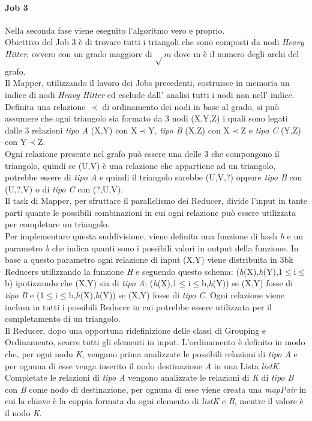 \documentclass[paper=a4, fontsize=11pt]{scrartcl}	%
\numberwithin{equation}{section}															%
\numberwithin{figure}{section}																%
\numberwithin{table}{section}																%
\begin{document}
\paragraph{Job 3}
Nella seconda fase viene eseguito l'algoritmo vero e proprio.\\
Obiettivo del Job 3 è di trovare tutti i triangoli che sono composti da nodi \textit{Heavy Hitter}, ovvero con un grado maggiore di $\sqrt{} m$ dove m è il numero degli archi del grafo.\\
Il Mapper, utilizzando il lavoro dei Jobs precedenti, costruisce in memoria un indice di nodi \textit{Heavy Hitter} ed esclude dall' analisi tutti i nodi non nell' indice.\\
Definita una relazione $\prec$ di ordinamento dei nodi in base al grado, si può assumere che ogni triangolo sia formato da 3 nodi (X,Y,Z) i quali sono legati dalle 3 relazioni \textit{tipo A} (X,Y) con X$\prec$Y, \textit{tipo B} (X,Z) con X$\prec$Z e \textit{tipo C} (Y,Z) con Y$\prec$Z.\\
Ogni relazione presente nel grafo può essere una delle 3 che compongono il triangolo, quindi se (U,V) è una relazione che appartiene ad un triangolo, potrebbe essere di \textit{tipo A} e quindi  il triangolo sarebbe (U,V,?) oppure \textit{tipo B} con (U,?,V) o di \textit{tipo C} con (?,U,V).\\
Il task di Mapper, per sfruttare il parallelismo dei Reducer, divide l'input in tante parti quante le possibili combinazioni in cui ogni relazione può essere utilizzata per completare un triangolo.\\
Per implementare questa suddivisione, viene definita una funzione di hash \textit{h} e un parametro \textit{b} che indica quanti sono i possibili valori in output della funzione. In base a questo parametro ogni relazione di input (X,Y) viene distribuita in 3bk Reducers utilizzando la funzione \textit{H} e seguendo questo schema: (\textit{h}(X),\textit{h}(Y),1$\leq$i$\leq$b) ipotizzando che (X,Y) sia di \textit{tipo A}; (\textit{h}(X),1$\leq$i$\leq$b,\textit{h}(Y)) se (X,Y) fosse di \textit{tipo B} e (1$\leq$i$\leq$b,\textit{h}(X),\textit{h}(Y)) se (X,Y) fosse di \textit{tipo C}. Ogni relazione viene inclusa in tutti i possibili Reducer in cui potrebbe essere utilizzata per il completamento di un triangolo.\\
Il Reducer, dopo una opportuna ridefinizione delle classi di Grouping e Ordinamento, scorre tutti gli elementi in input. L'ordinamento è definito in modo che, per ogni nodo \textit{K}, vengano prima analizzate le possibili relazioni di \textit{tipo A} e per ognuna di esse venga inserito il nodo destinazione \textit{A} in una Lista \textit{listK}. Completate le relazioni di \textit{tipo A} vengono analizzate le relazioni di \textit{K} di \textit{tipo B} con \textit{B} come nodo di destinazione, per ognuna di esse viene creata una \textit{mapPair} in cui la chiave è la coppia formata da ogni elemento di \textit{listK} e \textit{B}, mentre il valore è il nodo \textit{K}.
\end{document}

